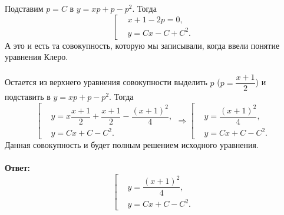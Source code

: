 \documentclass[a4paper, 12pt]{article}
\begin{document}
Подставим $p = C$ в $y = xp + p - p^2.$ Тогда 
$$\left[\begin{aligned}
	&x + 1 - 2p = 0,\\
	&y = Cx - C + C^2.
\end{aligned}\right.$$
А это и есть та совокупность, которую мы записывали, когда ввели понятие уравнения Клеро.\\\\
Остается из верхнего уравнения совокупности выделить $p$ ($p = \dfrac{x+1}{2}$) и подставить в $y = xp+ p - p^2.$ Тогда $$\left[\begin{aligned}
	&y = x\dfrac{x+1}{2} + \dfrac{x+1}{2} - \dfrac{(x+1)^2}{4},\\
	&y = Cx + C - C^2.
\end{aligned}\right.\Rightarrow \left[\begin{aligned}
&y = \dfrac{(x + 1)^2}{4},\\
&y = Cx + C - C^2.
\end{aligned}\right.$$
Данная совокупность и будет полным решением исходного уравнения.\\\\
\textbf{Ответ:} $$\left[\begin{aligned}
	&y = \dfrac{(x + 1)^2}{4},\\
	&y = Cx + C - C^2.
\end{aligned}\right.$$
\end{document}
